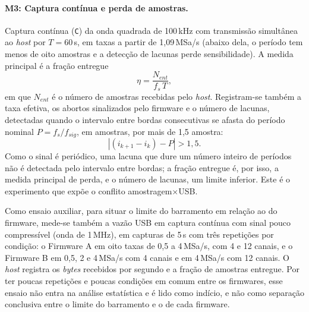 \paragraph{M3: Captura contínua e perda de amostras.} Captura contínua (\texttt{C}) da onda quadrada de 100\,kHz com transmissão
simultânea ao \emph{host} por $T = 60$\,s, em taxas a partir de 1,09\,MSa/s (abaixo
dela, o período tem menos de oito amostras e a detecção de lacunas perde
sensibilidade). A medida principal é a fração entregue
\begin{equation}\label{eq:m3-fracao}
  \eta = \frac{N_{ent}}{f_s \, T},
\end{equation}
em que $N_{ent}$ é o número de amostras recebidas pelo \emph{host}. Registram-se
também a taxa efetiva, os abortos sinalizados pelo firmware e o número de
lacunas, detectadas quando o intervalo entre bordas consecutivas se afasta do
período nominal $P = f_s/f_{sig}$, em amostras, por mais de 1,5 amostra:
\begin{equation}\label{eq:m3-lacuna}
  \left| (i_{k+1} - i_k) - P \right| > 1{,}5 .
\end{equation} Como o sinal é
periódico, uma lacuna que dure um número inteiro de períodos não é detectada
pelo intervalo entre bordas; a fração entregue é, por isso, a medida principal
de perda, e o número de lacunas, um limite inferior. Este é o experimento que
expõe o conflito amostragem$\times$\ac{USB}.

Como ensaio auxiliar, para situar o limite do barramento em relação ao do
firmware, mede-se também a vazão \ac{USB} em captura contínua com sinal pouco
compressível (onda de 1\,MHz), em capturas de 5\,s com três repetições por
condição: o Firmware A em oito taxas de 0,5 a 4\,MSa/s, com 4 e 12 canais, e o
Firmware B em 0,5, 2 e 4\,MSa/s com 4 canais e em 4\,MSa/s com 12 canais. O
\emph{host} registra os \emph{bytes} recebidos por segundo e a fração de
amostras entregue. Por ter poucas repetições e poucas condições em comum
entre os firmwares, esse ensaio não entra na análise estatística e é lido
como indício, e não como separação conclusiva entre o limite do barramento e
o de cada firmware.


